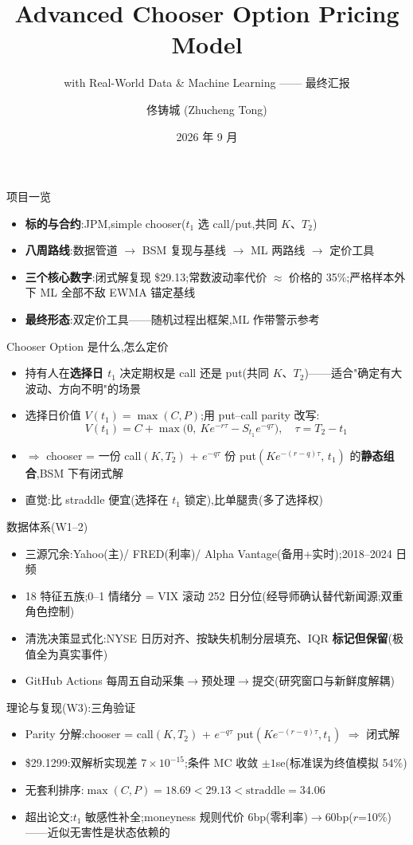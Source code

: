 \documentclass[aspectratio=169]{beamer}
\title{Advanced Chooser Option Pricing Model}
\subtitle{with Real-World Data \& Machine Learning —— 最终汇报}
\author{佟铸城 (Zhucheng Tong)}
\date{2026 年 9 月}
\begin{document}
\frame{\titlepage}

\begin{frame}{项目一览}
\begin{itemize}
  \item \textbf{标的与合约}:JPM,simple chooser($t_1$ 选 call/put,共同 $K$、$T_2$)
  \item \textbf{八周路线}:数据管道 $\to$ BSM 复现与基线 $\to$ ML 两路线 $\to$ 定价工具
  \item \textbf{三个核心数字}:闭式解复现 \$29.13;常数波动率代价 $\approx$ 价格的 35\%;严格样本外下 ML 全部不敌 EWMA 锚定基线
  \item \textbf{最终形态}:双定价工具——随机过程出框架,ML 作带警示参考
\end{itemize}
\end{frame}

\begin{frame}{Chooser Option 是什么,怎么定价}
\begin{itemize}
  \item 持有人在\textbf{选择日 $t_1$} 决定期权是 call 还是 put(共同 $K$、$T_2$)——适合"确定有大波动、方向不明"的场景
  \item 选择日价值 $V(t_1)=\max(C,P)$;用 put--call parity 改写:
  \[ V(t_1) = C + \max\!\big(0,\ Ke^{-r\tau} - S_{t_1}e^{-q\tau}\big), \quad \tau = T_2 - t_1 \]
  \item $\Rightarrow$ chooser = 一份 call$(K,T_2)$ + $e^{-q\tau}$ 份 put$(Ke^{-(r-q)\tau},\,t_1)$ 的\textbf{静态组合},BSM 下有闭式解
  \item 直觉:比 straddle 便宜(选择在 $t_1$ 锁定),比单腿贵(多了选择权)
\end{itemize}
\end{frame}

\begin{frame}{数据体系(W1--2)}
\begin{itemize}
  \item 三源冗余:Yahoo(主)/ FRED(利率)/ Alpha Vantage(备用+实时);2018--2024 日频
  \item 18 特征五族;0--1 情绪分 = VIX 滚动 252 日分位(经导师确认替代新闻源;双重角色控制)
  \item 清洗决策显式化:NYSE 日历对齐、按缺失机制分层填充、IQR \textbf{标记但保留}(极值全为真实事件)
  \item GitHub Actions 每周五自动采集$\to$预处理$\to$提交(研究窗口与新鲜度解耦)
\end{itemize}
\end{frame}

\begin{frame}{理论与复现(W3):三角验证}
\begin{itemize}
  \item Parity 分解:chooser = call$(K,T_2)$ + $e^{-q\tau}$ put$(Ke^{-(r-q)\tau},t_1)$ $\Rightarrow$ 闭式解
  \item \$29.1299:双解析实现差 $7\times10^{-15}$;条件 MC 收敛 $\pm1$se(标准误为终值模拟 54\%)
  \item 无套利排序:$\max(C,P)=18.69 < 29.13 < \text{straddle}=34.06$
  \item 超出论文:$t_1$ 敏感性补全;moneyness 规则代价 6bp(零利率)$\to$60bp($r$=10\%)——近似无害性是状态依赖的
\end{itemize}
\end{frame}
\end{document}
